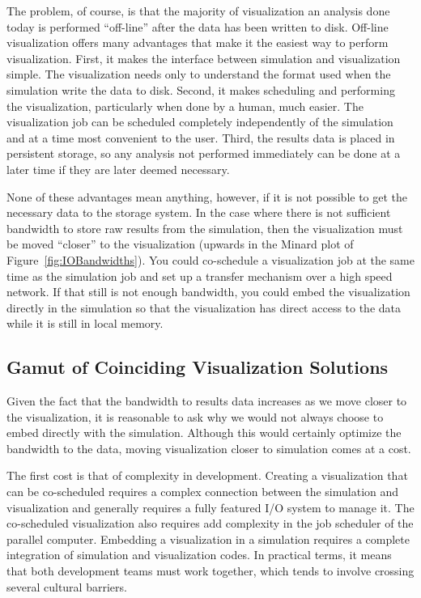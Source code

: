 \documentclass[conference]{IEEEtran}
\begin{document}
The problem, of course, is that the majority of visualization an analysis
done today is performed ``off-line'' after the data has been written to
disk.  Off-line visualization offers many advantages that make it the
easiest way to perform visualization.  First, it makes the interface
between simulation and visualization simple.  The visualization needs only
to understand the format used when the simulation write the data to disk.
Second, it makes scheduling and performing the visualization, particularly
when done by a human, much easier.  The visualization job can be scheduled
completely independently of the simulation and at a time most convenient
to the user.  Third, the results data is placed in persistent storage, so
any analysis not performed immediately can be done at a later time if they
are later deemed necessary.

None of these advantages mean anything, however, if it is not possible to
get the necessary data to the storage system.  In the case where there is
not sufficient bandwidth to store raw results from the simulation, then the
visualization must be moved ``closer'' to the visualization (upwards in the
Minard plot of Figure~\ref{fig:IOBandwidths}).  You could co-schedule a
visualization job at the same time as the simulation job and set up a
transfer mechanism over a high speed network.  If that still is not enough
bandwidth, you could embed the visualization directly in the simulation so
that the visualization has direct access to the data while it is still in
local memory.

\subsection{Gamut of Coinciding Visualization Solutions}

\noindent
Given the fact that the bandwidth to results data increases as we move
closer to the visualization, it is reasonable to ask why we would not
always choose to embed directly with the simulation.  Although this would
certainly optimize the bandwidth to the data, moving visualization closer
to simulation comes at a cost.

The first cost is that of complexity in development.  Creating a
visualization that can be co-scheduled requires a complex connection
between the simulation and visualization and generally requires a fully
featured I/O system to manage it.  The co-scheduled visualization also
requires add complexity in the job scheduler of the parallel computer.
Embedding a visualization in a simulation requires a complete integration
of simulation and visualization codes.  In practical terms, it means that
both development teams must work together, which tends to involve crossing
several cultural barriers.
\end{document}
